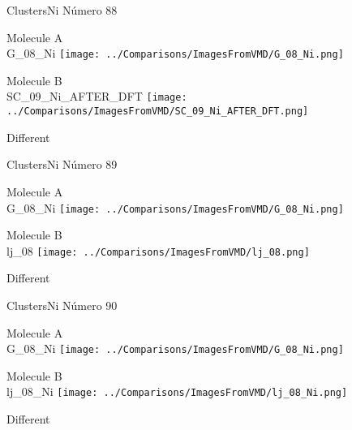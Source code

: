 \vtab[-3cm]
\begin{center}
{\large ClustersNi \tab Número 88}
\end{center}
\begin{multicols}{2}
\begin{center}
Molecule A \\ 
G\_08\_Ni
\texttt{[image: ../Comparisons/ImagesFromVMD/G\_08\_Ni.png]}
\\
\vtab

\columnbreak
Molecule B \\ 
SC\_09\_Ni\_AFTER\_DFT
\texttt{[image: ../Comparisons/ImagesFromVMD/SC\_09\_Ni\_AFTER\_DFT.png]}
\\
\vtab


\end{center}
\end{multicols}
\begin{center}
\textcolor{NavyBlue}{\Large Different}
\end{center}

 \newpage

\vtab[-3cm]
\begin{center}
{\large ClustersNi \tab Número 89}
\end{center}
\begin{multicols}{2}
\begin{center}
Molecule A \\ 
G\_08\_Ni
\texttt{[image: ../Comparisons/ImagesFromVMD/G\_08\_Ni.png]}
\\
\vtab

\columnbreak
Molecule B \\ 
lj\_08
\texttt{[image: ../Comparisons/ImagesFromVMD/lj\_08.png]}
\\
\vtab


\end{center}
\end{multicols}
\begin{center}
\textcolor{NavyBlue}{\Large Different}
\end{center}

 \newpage

\vtab[-3cm]
\begin{center}
{\large ClustersNi \tab Número 90}
\end{center}
\begin{multicols}{2}
\begin{center}
Molecule A \\ 
G\_08\_Ni
\texttt{[image: ../Comparisons/ImagesFromVMD/G\_08\_Ni.png]}
\\
\vtab

\columnbreak
Molecule B \\ 
lj\_08\_Ni
\texttt{[image: ../Comparisons/ImagesFromVMD/lj\_08\_Ni.png]}
\\
\vtab


\end{center}
\end{multicols}
\begin{center}
\textcolor{NavyBlue}{\Large Different}
\end{center}

